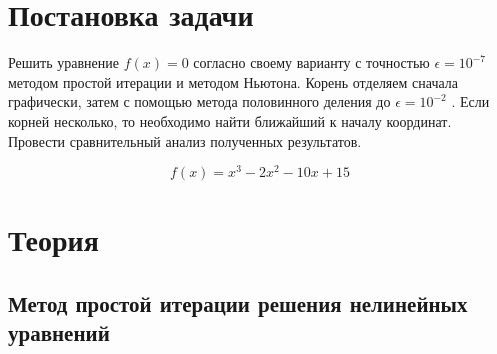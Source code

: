 \documentclass[12pt, a4paper]{article}
\begin{document}
	
	\begin{titlepage}
	\end{titlepage}

	\tableofcontents

	 \section{Постановка задачи}
	 Решить уравнение $f(x)=0$ согласно своему варианту с точностью $\epsilon = 10^{-7}$ методом простой итерации и методом Ньютона. Корень отделяем сначала графически, затем с помощью метода половинного деления до $\epsilon = 10^{-2}$ . Если корней несколько, то необходимо найти ближайший к началу координат. Провести сравнительный анализ полученных результатов.
	 
	 \begin{equation} \label{eqn:func}
	 	f(x)=x^3 - 2x^2 -10x + 15
	 \end{equation}
	 
	 \section{Теория}
	 
	 	 \subsection{Метод простой итерации решения нелинейных уравнений}
	 
\end{document}
